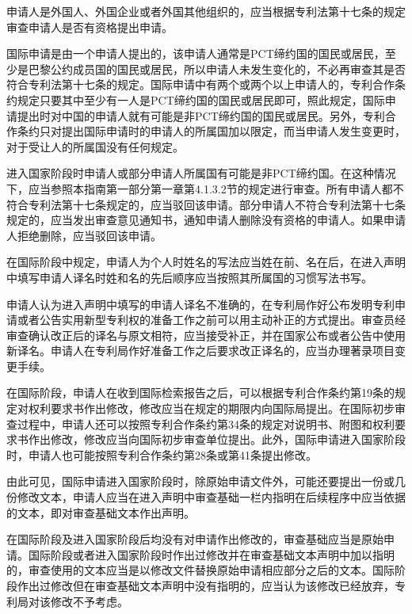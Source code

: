 申请人是外国人、外国企业或者外国其他组织的，应当根据专利法第十七条的规定审查申请人是否有资格提出申请。

国际申请是由一个申请人提出的，该申请人通常是PCT缔约国的国民或居民，至少是巴黎公约成员国的国民或居民，所以申请人未发生变化的，不必再审查其是否符合专利法第十七条的规定。国际申请中有两个或两个以上申请人的，专利合作条约规定只要其中至少有一人是PCT缔约国的国民或居民即可，照此规定，国际申请提出时对中国的申请人就有可能是非PCT缔约国的国民或居民。另外，专利合作条约只对提出国际申请时的申请人的所属国加以限定，而当申请人发生变更时，对于受让人的所属国没有任何规定。

进入国家阶段时申请人或部分申请人所属国有可能是非PCT缔约国。在这种情况下，应当参照本指南第一部分第一章第4.1.3.2节的规定进行审查。所有申请人都不符合专利法第十七条规定的，应当驳回该申请。部分申请人不符合专利法第十七条规定的，应当发出审查意见通知书，通知申请人删除没有资格的申请人。如果申请人拒绝删除，应当驳回该申请。

在国际阶段中规定，申请人为个人时姓名的写法应当姓在前、名在后，在进入声明中填写申请人译名时姓和名的先后顺序应当按照其所属国的习惯写法书写。

申请人认为进入声明中填写的申请人译名不准确的，在专利局作好公布发明专利申请或者公告实用新型专利权的准备工作之前可以用主动补正的方式提出。审查员经审查确认改正后的译名与原文相符，应当接受补正，并在国家公布或者公告中使用新译名。申请人在专利局作好准备工作之后要求改正译名的，应当办理著录项目变更手续。

在国际阶段，申请人在收到国际检索报告之后，可以根据专利合作条约第19条的规定对权利要求书作出修改，修改应当在规定的期限内向国际局提出。在国际初步审查过程中，申请人还可以按照专利合作条约第34条的规定对说明书、附图和权利要求书作出修改，修改应当向国际初步审查单位提出。此外，国际申请进入国家阶段时，申请人也可能按照专利合作条约第28条或第41条提出修改。

由此可见，国际申请进入国家阶段时，除原始申请文件外，可能还要提出一份或几份修改文本，申请人应当在进入声明中审查基础一栏内指明在后续程序中应当依据的文本，即对审查基础文本作出声明。

在国际阶段及进入国家阶段后均没有对申请作出修改的，审查基础应当是原始申请。国际阶段或者进入国家阶段时作出过修改并在审查基础文本声明中加以指明的，审查使用的文本应当是以修改文件替换原始申请相应部分之后的文本。国际阶段作出过修改但在审查基础文本声明中没有指明的，应当认为该修改已经放弃，专利局对该修改不予考虑。

